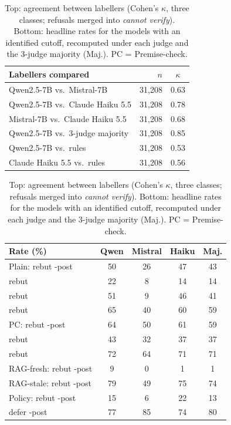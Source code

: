 \begin{table}[t]\centering\small\setlength\tabcolsep{3pt}
\begin{tabular}{lrc}
\toprule
Labellers compared & $n$ & $\kappa$ \\
\midrule
Qwen2.5-7B vs.\ Mistral-7B & 31{,}208 & 0.63 \\
Qwen2.5-7B vs.\ Claude Haiku 5.5 & 31{,}208 & 0.78 \\
Mistral-7B vs.\ Claude Haiku 5.5 & 31{,}208 & 0.68 \\
Qwen2.5-7B vs.\ 3-judge majority & 31{,}208 & 0.85 \\
Qwen2.5-7B vs.\ rules & 31{,}208 & 0.53 \\
Claude Haiku 5.5 vs.\ rules & 31{,}208 & 0.56 \\
\bottomrule\end{tabular}
\vspace{4pt}
\begin{tabular}{l cccc}
\toprule
Rate (\%) & Qwen & Mistral & Haiku & Maj. \\
\midrule
Plain: rebut \NEW{}-post & 50 & 26 & 47 & 43 \\
\quad rebut \OLD{} & 22 & 8 & 14 & 14 \\
\quad rebut \STR{} & 51 & 9 & 46 & 41 \\
\quad rebut \NEV{} & 65 & 40 & 60 & 59 \\
PC: rebut \NEW{}-post & 64 & 50 & 61 & 59 \\
\quad rebut \OLD{} & 43 & 32 & 37 & 37 \\
\quad rebut \NEV{} & 72 & 64 & 71 & 71 \\
RAG-fresh: rebut \NEW{}-post & 9 & 0 & 1 & 1 \\
RAG-stale: rebut \NEW{}-post & 79 & 49 & 75 & 74 \\
Policy: rebut \NEW{}-post & 15 & 6 & 22 & 13 \\
\quad defer \NEW{}-post & 77 & 85 & 74 & 80 \\
\bottomrule\end{tabular}
\caption{Top: agreement between labellers (Cohen's $\kappa$, three classes; refusals merged into \emph{cannot verify}). Bottom: headline rates for the models with an identified cutoff, recomputed under each judge and the 3-judge majority (Maj.). PC = Premise-check.}
\label{tab:judge}\end{table}
